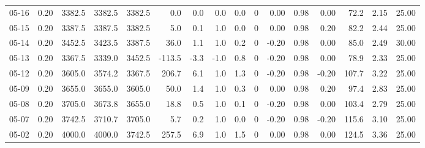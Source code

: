 \begin{threeparttable}
{\begin{tabular}{lrrrrrrrrrrrrrrr}
  05-16 &     0.20 & 3382.5 & 3382.5 & 3382.5 &        0.0 &            0.0 &                      0.0 &                 0.0 &              0 &       0.00 &      0.98 &           0.00 &             72.2 &            2.15 &                  25.00 \\
  05-15 &     0.20 & 3387.5 & 3387.5 & 3382.5 &        5.0 &            0.1 &                      1.0 &                 0.0 &              0 &       0.00 &      0.98 &           0.20 &             82.2 &            2.44 &                  25.00 \\
  05-14 &     0.20 & 3452.5 & 3423.5 & 3387.5 &       36.0 &            1.1 &                      1.0 &                 0.2 &              0 &      -0.20 &      0.98 &           0.00 &             85.0 &            2.49 &                  30.00 \\
  05-13 &     0.20 & 3367.5 & 3339.0 & 3452.5 &     -113.5 &           -3.3 &                     -1.0 &                 0.8 &              0 &      -0.20 &      0.98 &           0.00 &             78.9 &            2.33 &                  25.00 \\
  05-12 &     0.20 & 3605.0 & 3574.2 & 3367.5 &      206.7 &            6.1 &                      1.0 &                 1.3 &              0 &      -0.20 &      0.98 &          -0.20 &            107.7 &            3.22 &                  25.00 \\
  05-09 &     0.20 & 3655.0 & 3655.0 & 3605.0 &       50.0 &            1.4 &                      1.0 &                 0.3 &              0 &       0.00 &      0.98 &           0.20 &             97.4 &            2.83 &                  25.00 \\
  05-08 &     0.20 & 3705.0 & 3673.8 & 3655.0 &       18.8 &            0.5 &                      1.0 &                 0.1 &              0 &      -0.20 &      0.98 &           0.00 &            103.4 &            2.79 &                  25.00 \\
  05-07 &     0.20 & 3742.5 & 3710.7 & 3705.0 &        5.7 &            0.2 &                      1.0 &                 0.0 &              0 &      -0.20 &      0.98 &          -0.20 &            115.6 &            3.10 &                  25.00 \\
  05-02 &     0.20 & 4000.0 & 4000.0 & 3742.5 &      257.5 &            6.9 &                      1.0 &                 1.5 &              0 &       0.00 &      0.98 &           0.00 &            124.5 &            3.36 &                  25.00 \\

\end{tabular}}
\end{threeparttable}
